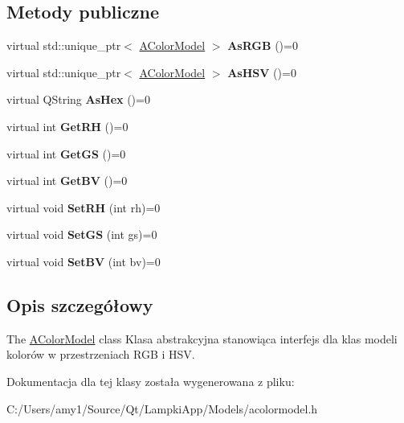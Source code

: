 \subsection*{Metody publiczne}
\begin{DoxyCompactItemize}
\item 
\mbox{\label{class_a_color_model_a4470865f3afc2f31e710d9a59d03977a}} 
virtual std\+::unique\+\_\+ptr$<$ \mbox{\hyperlink{class_a_color_model}{A\+Color\+Model}} $>$ {\bfseries As\+R\+GB} ()=0
\item 
\mbox{\label{class_a_color_model_a12340b3af356d03303b15717ca4ba042}} 
virtual std\+::unique\+\_\+ptr$<$ \mbox{\hyperlink{class_a_color_model}{A\+Color\+Model}} $>$ {\bfseries As\+H\+SV} ()=0
\item 
\mbox{\label{class_a_color_model_a64682636f42f22b9c90bc0f41d6b6993}} 
virtual Q\+String {\bfseries As\+Hex} ()=0
\item 
\mbox{\label{class_a_color_model_a8919f286412465faaa8d17ed4251889f}} 
virtual int {\bfseries Get\+RH} ()=0
\item 
\mbox{\label{class_a_color_model_a05e7b42a530a9856636c87111ee4c2ee}} 
virtual int {\bfseries Get\+GS} ()=0
\item 
\mbox{\label{class_a_color_model_a9ea2fa3db7783570f6ac38c75206e979}} 
virtual int {\bfseries Get\+BV} ()=0
\item 
\mbox{\label{class_a_color_model_aa6eb3eb0741790d4a624875cb3d18d6f}} 
virtual void {\bfseries Set\+RH} (int rh)=0
\item 
\mbox{\label{class_a_color_model_a009adc0bb0e2586c0b111fdbf0cb58d1}} 
virtual void {\bfseries Set\+GS} (int gs)=0
\item 
\mbox{\label{class_a_color_model_a645fa27531dc1a37136bc9dd5035104f}} 
virtual void {\bfseries Set\+BV} (int bv)=0
\end{DoxyCompactItemize}


\subsection{Opis szczegółowy}
The \mbox{\hyperlink{class_a_color_model}{A\+Color\+Model}} class Klasa abstrakcyjna stanowiąca interfejs dla klas modeli kolorów w przestrzeniach R\+GB i H\+SV. 

Dokumentacja dla tej klasy została wygenerowana z pliku\+:\begin{DoxyCompactItemize}
\item 
C\+:/\+Users/amy1/\+Source/\+Qt/\+Lampki\+App/\+Models/acolormodel.\+h\end{DoxyCompactItemize}
